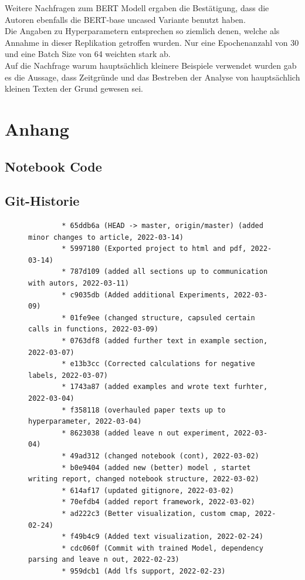 \documentclass[DIV=13,fontsize=11pt]{scrartcl}
\begin{document}
Weitere Nachfragen zum BERT Modell ergaben die Bestätigung, dass die Autoren ebenfalls die BERT-base uncased Variante benutzt haben.\\

Die Angaben zu Hyperparametern entsprechen so ziemlich denen, welche als Annahme in dieser Replikation getroffen wurden. Nur
eine Epochenanzahl von 30 und eine Batch Size von 64 weichten stark ab.\\

Auf die Nachfrage warum hauptsächlich kleinere Beispiele verwendet wurden gab es die Aussage, dass Zeitgründe und das
Bestreben der Analyse von hauptsächlich kleinen Texten der Grund gewesen sei.

\section{Anhang}

\subsection{Notebook Code}



\subsection{Git-Historie}
\begin{figure}[H]
    \tiny
    \begin{lstlisting}
        * 65ddb6a (HEAD -> master, origin/master) (added minor changes to article, 2022-03-14)
        * 5997180 (Exported project to html and pdf, 2022-03-14)
        * 787d109 (added all sections up to communication with autors, 2022-03-11)
        * c9035db (Added additional Experiments, 2022-03-09)
        * 01fe9ee (changed structure, capsuled certain calls in functions, 2022-03-09)
        * 0763df8 (added further text in example section, 2022-03-07)
        * e13b3cc (Corrected calculations for negative labels, 2022-03-07)
        * 1743a87 (added examples and wrote text furhter, 2022-03-04)
        * f358118 (overhauled paper texts up to hyperparameter, 2022-03-04)
        * 8623038 (added leave n out experiment, 2022-03-04)
        * 49ad312 (changed notebook (cont), 2022-03-02)
        * b0e9404 (added new (better) model , startet writing report, changed notebook structure, 2022-03-02)
        * 614af17 (updated gitignore, 2022-03-02)
        * 70efdb4 (added report framework, 2022-03-02)
        * ad222c3 (Better visualization, custom cmap, 2022-02-24)
        * f49b4c9 (Added text visualization, 2022-02-24)
        * cdc060f (Commit with trained Model, dependency parsing and leave n out, 2022-02-23)
        * 959dcb1 (Add lfs support, 2022-02-23)                
    \end{lstlisting}
\end{figure}
\printbibliography
\end{document}
